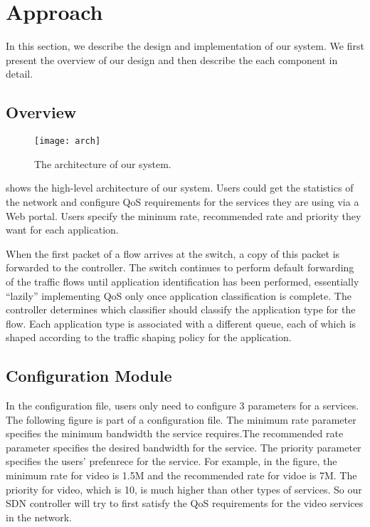 \section{Approach}
\label{sect:approach}
In this section, we describe the design and implementation of our system. 
We first present the overview of our design and then describe the each component in detail.

\subsection{Overview}

\begin{figure}[htb]
\centering
\texttt{[image: arch]}
\caption{The architecture of our system.}
\label{fig:architecture}
\end{figure}

 shows the high-level architecture of our system.
Users could get the statistics of the network and configure QoS requirements for the services they are using via a Web portal. Users specify the mininum rate, recommended rate and priority they want for each application. 

When the first packet of a flow arrives at the switch, a
copy of this packet is forwarded to the controller. The switch
continues to perform default forwarding of the traffic flows until
application identification has been performed, essentially
“lazily” implementing QoS only once application classification
is complete. The controller determines which classifier
should classify the application type for the flow. Each application
type is associated with a different queue, each of
which is shaped according to the traffic shaping policy for the application.

\subsection{Configuration Module}
In the configuration file, users only need to configure 3 parameters for a services. The following figure is part of a configuration file.
The minimum rate parameter specifies the minimum bandwidth the service requires.The recommended rate parameter specifies the desired bandwidth for the service.
The priority parameter specifies the users' prefenrece for the service.
For example, in the figure, the minimum rate for video is 1.5M and the recommended rate for vidoe is 7M. The priority for video, which is 10, is much higher than other types of services. So our SDN controller will try to first satisfy the QoS requirements for the video services in the network.

